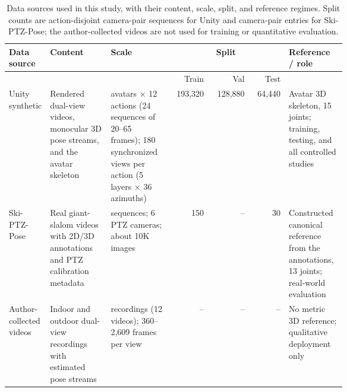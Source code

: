 \begin{table}[!htb]
\centering
\caption{Data sources used in this study, with their content, scale, split, and reference regimes. Split counts are action-disjoint camera-pair sequences for Unity and camera-pair entries for Ski-PTZ-Pose; the author-collected videos are not used for training or quantitative evaluation.}
\label{tab:dataset_summary}
\footnotesize
\setlength{\tabcolsep}{3pt}
\renewcommand{\arraystretch}{1.08}
\begin{tabular}{@{}>{\raggedright\arraybackslash}p{0.125\linewidth}
                >{\raggedright\arraybackslash}p{0.18\linewidth}
                >{\raggedright\arraybackslash}p{0.18\linewidth}
                rrr
                >{\raggedright\arraybackslash}p{0.17\linewidth}@{}}
\toprule
Data source & Content & Scale & \multicolumn{3}{c}{Split} & Reference / role \\
\cmidrule(lr){4-6} & & & Train & Val & Test & \\
\midrule
Unity synthetic & Rendered dual-view videos, monocular 3D pose streams, and the avatar skeleton & 2 avatars \(\times\) 12 actions (24 sequences of 20--65 frames); 180 synchronized views per action (5 layers \(\times\) 36 azimuths) & 193,320 & 128,880 & 64,440 & Avatar 3D skeleton, 15 joints; training, testing, and all controlled studies \\
\midrule
Ski-PTZ-Pose & Real giant-slalom videos with 2D/3D annotations and PTZ calibration metadata & 12 sequences; 6 PTZ cameras; about 10K images & 150 & -- & 30 & Constructed canonical reference from the annotations, 13 joints; real-world evaluation \\
\midrule
Author-collected videos & Indoor and outdoor dual-view recordings with estimated pose streams & 6 recordings (12 videos); 360--2,609 frames per view & -- & -- & -- & No metric 3D reference; qualitative deployment only \\
\bottomrule
\end{tabular}
\end{table}
